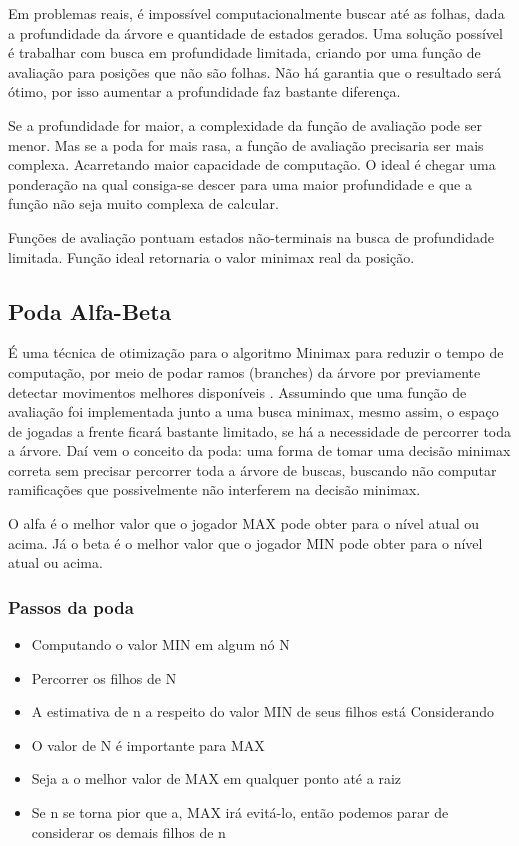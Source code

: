 \documentclass[sigplan,screen]{acmart}
\begin{document}
Em problemas reais, é impossível computacionalmente buscar até as folhas, dada a profundidade da árvore e quantidade de estados gerados.
Uma solução possível é trabalhar com busca em profundidade limitada, criando por uma função de avaliação para posições que não são folhas.
Não há garantia que o resultado será ótimo, por isso aumentar a profundidade faz bastante diferença.

Se a profundidade for maior, a complexidade da função de avaliação pode ser menor. Mas se a poda for mais rasa, a função de avaliação precisaria ser mais complexa. 
Acarretando maior capacidade de computação. 
O ideal é chegar uma ponderação na qual consiga-se descer para uma maior profundidade e que a função não seja muito complexa de calcular.

Funções de avaliação pontuam estados não-terminais na busca de profundidade limitada.
Função ideal retornaria o valor minimax real da posição.

\subsection{Poda Alfa-Beta}
É uma técnica de otimização para o algoritmo Minimax para reduzir o tempo de computação, por meio de podar ramos (branches) da árvore por previamente detectar movimentos melhores disponíveis \cite{Aradhya04}.
Assumindo que uma função de avaliação foi implementada junto a uma busca minimax, mesmo assim, o espaço de jogadas a frente ficará bastante limitado, se há a necessidade de percorrer toda a árvore.
Daí vem o conceito da poda: uma forma de tomar uma decisão minimax correta sem precisar percorrer toda a árvore de buscas, buscando não computar ramificações que possivelmente não interferem na decisão minimax.

O alfa é o melhor valor que o jogador MAX pode obter para o nível atual ou acima. Já o beta é o melhor valor que o jogador MIN pode obter para o nível atual ou acima.

\subsubsection{Passos da poda}
\begin{itemize}
  \item Computando o valor MIN em algum nó N
  \item Percorrer os filhos de N
  \item A estimativa de n a respeito do valor MIN de seus filhos está Considerando
  \item O valor de N é importante para MAX
  \item Seja a o melhor valor de MAX em qualquer ponto até a raiz
  \item Se n se torna pior que a, MAX irá evitá-lo, então podemos parar de considerar os demais filhos de n
\end{itemize}
\end{document}
